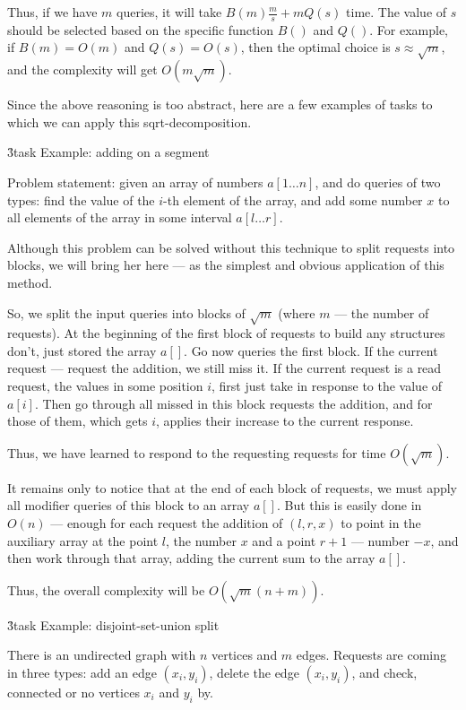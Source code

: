 Thus, if we have $m$ queries, it will take $B(m) \frac{m}{s} + m Q(s)$ time. The value of $s$ should be selected based on the specific function $B()$ and $Q()$. For example, if $B(m)=O(m)$ and $Q(s)=O(s)$, then the optimal choice is $s \approx \sqrt{m}$, and the complexity will get $O (m \sqrt{m})$.

Since the above reasoning is too abstract, here are a few examples of tasks to which we can apply this sqrt-decomposition.


\h3{task Example: adding on a segment}

Problem statement: given an array of numbers $a[1 \ldots n]$, and do queries of two types: find the value of the $i$-th element of the array, and add some number $x$ to all elements of the array in some interval $a[l \dots r]$.

Although this problem can be solved without this technique to split requests into blocks, we will bring her here --- as the simplest and obvious application of this method.

So, we split the input queries into blocks of $\sqrt{m}$ (where $m$ --- the number of requests). At the beginning of the first block of requests to build any structures don't, just stored the array $a[]$. Go now queries the first block. If the current request --- request the addition, we still miss it. If the current request is a read request, the values in some position $i$, first just take in response to the value of $a[i]$. Then go through all missed in this block requests the addition, and for those of them, which gets $i$, applies their increase to the current response.

Thus, we have learned to respond to the requesting requests for time $O(\sqrt{m})$.

It remains only to notice that at the end of each block of requests, we must apply all modifier queries of this block to an array $a[]$. But this is easily done in $O(n)$ --- enough for each request the addition of $(l,r,x)$ to point in the auxiliary array at the point $l$, the number $x$ and a point $r+1$ --- number $-x$, and then work through that array, adding the current sum to the array $a[]$.

Thus, the overall complexity will be $O (\sqrt{m} (n + m))$.


\h3{task Example: disjoint-set-union split}

There is an undirected graph with $n$ vertices and $m$ edges. Requests are coming in three types: add an edge $(x_i,y_i)$, delete the edge $(x_i,y_i)$, and check, connected or no vertices $x_i$ and $y_i$ by.

